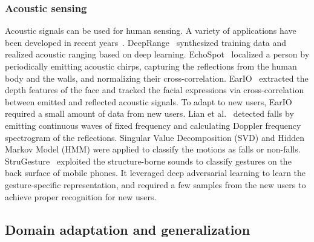 \subsubsection{Acoustic sensing}
Acoustic signals can be used for human sensing. A variety of applications have been developed in recent years~\cite{CaiC:2022}. 
DeepRange~\cite{MaoW:2020} synthesized training data and realized acoustic ranging based on deep learning. 
EchoSpot~\cite{LianJEchoSpot:2021} localized a person by periodically emitting acoustic chirps, capturing the reflections from the human body and the walls, and normalizing their cross-correlation. 
EarIO~\cite{LiK:2022} extracted the depth features of the face and tracked the facial expressions via cross-correlation between emitted and reflected acoustic signals. To adapt to new users, EarIO required a small amount of data from new users.
Lian et al.~\cite{LianJ:2021} detected falls by emitting continuous waves of fixed frequency and calculating Doppler frequency spectrogram of the reflections. Singular Value Decomposition (SVD) and Hidden Markov Model (HMM) were applied to classify the motions as falls or non-falls. 
StruGesture~\cite{WangL:2021} exploited the structure-borne sounds to classify gestures on the back surface of mobile phones. It leveraged deep adversarial learning to learn the gesture-specific representation, and required a few samples from the new users to achieve proper recognition for new users.

\subsection{Domain adaptation and generalization}

